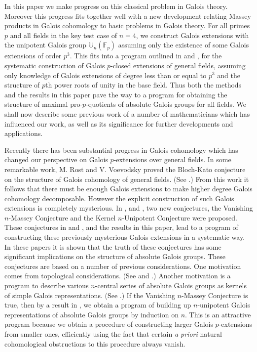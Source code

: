\documentclass[12pt,leqno]{amsart}
\theoremstyle{plain}
\theoremstyle{definition}
\newcommand{\F}{{\mathbb F}}
\newcommand{\U}{{\mathbb U}}
\begin{document}
In this paper we make  progress on this classical problem in Galois theory. Moreover this progress fits together well with a new development relating Massey products in Galois cohomology to basic problems in Galois theory. 
For all primes $p$ and all fields in the key test case of $n=4$, we construct Galois extensions with the unipotent Galois group $\U_n(\F_p)$ assuming only the existence of some Galois extensions of order $p^3$. 
  This fits into a program outlined in \cite{MT1} and \cite{MT2}, for the systematic construction of Galois $p$-closed extensions of general fields, assuming only knowledge of Galois extensions of degree less than or equal to $p^3$ and the structure of $p$th power roots of unity in the base field.
Thus both the methods and the  results in this paper pave the way to a program for obtaining  the structure of maximal pro-$p$-quotients of absolute Galois groups for all fields. We shall now describe some previous work of a number of mathematicians which has influenced our work, as well as its significance for further developments and applications.

Recently  there has been   substantial progress in Galois cohomology which has changed our perspective on Galois $p$-extensions over general fields. In some remarkable work, M. Rost and V. Voevodsky proved the Bloch-Kato conjecture on the structure of  Galois cohomology of general fields. (See \cite{Voe1,Voe2}.) 
From this work it follows that there must be enough Galois extensions to make higher degree Galois cohomology decomposable. However the explicit construction of such Galois extensions is completely mysterious. 
In \cite{MT1}, \cite{MT2} and \cite{MT5},  two new conjectures, the Vanishing $n$-Massey Conjecture and the Kernel $n$-Unipotent Conjecture were proposed. 
These conjectures in \cite{MT1} and \cite{MT2}, and the results in this paper, lead to a program of constructing these previously mysterious Galois extensions in a systematic way.
In these papers it is shown that the truth of these conjectures has some significant implications on the structure of absolute Galois groups.
These conjectures are based on a number of previous considerations. One motivation comes from topological considerations. (See \cite{DGMS} and \cite{HW}.) Another motivation is a program to describe various $n$-central series of absolute Galois groups as kernels of simple Galois representations. (See \cite{CEM, Ef, EM1,EM2, MSp,NQD,Vi}.)
If the Vanishing $n$-Massey Conjecture is true, then by a result in \cite{Dwy}, we obtain a program of building up $n$-unipotent Galois representations of absolute Galois groups  by induction on $n$. This is an attractive program because we  obtain a procedure of constructing larger Galois $p$-extensions from smaller ones, efficiently  using  the fact that certain {\it a priori} natural cohomological obstructions to this procedure  always vanish. 
\end{document}
